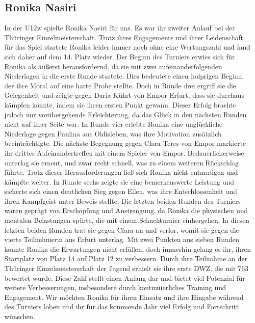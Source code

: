 \documentclass[a4paper,ngerman]{tui-algo-seminar}
\begin{document}
\subsection{Ronika Nasiri}
In der U12w spielte Ronika Nasiri für uns. Es war ihr zweiter Anlauf bei der Thüringer Einzelmeisterschaft. Trotz ihres Engagements und ihrer Leidenschaft für das Spiel startete Ronika leider immer noch ohne eine Wertungszahl und fand sich daher auf dem 14. Platz wieder. Der Beginn des Turniers erwies sich für Ronika als äußerst herausfordernd, da sie mit zwei aufeinanderfolgenden Niederlagen in die erste Runde startete. Dies bedeutete einen holprigen Beginn, der ihre Moral auf eine harte Probe stellte. Doch in Runde drei ergriff sie die Gelegenheit und zeigte gegen Daria Kührt von Empor Erfurt, dass sie durchaus kämpfen konnte, indem sie ihren ersten Punkt gewann. Dieser Erfolg brachte jedoch nur vorübergehende Erleichterung, da das Glück in den nächsten Runden nicht auf ihrer Seite war.
In Runde vier erlebte Ronika eine unglückliche Niederlage gegen Paulina aus Oldisleben, was ihre Motivation zusätzlich beeinträchtigte. Die nächste Begegnung gegen Clara Teres von Empor markierte ihr drittes Aufeinandertreffen mit einem Spieler von Empor. Bedauerlicherweise unterlag sie erneut, und zwar recht schnell, was zu einem weiteren Rückschlag führte. Trotz dieser Herausforderungen ließ sich Ronika nicht entmutigen und kämpfte weiter.
In Runde sechs zeigte sie eine bemerkenswerte Leistung und sicherte sich einen deutlichen Sieg gegen Ellen, was ihre Entschlossenheit und ihren Kampfgeist unter Beweis stellte. Die letzten beiden Runden des Turniers waren geprägt von Erschöpfung und Anstrengung, da Ronika die physischen und mentalen Belastungen spürte, die mit einem Schachturnier einhergehen. In diesen letzten beiden Runden trat sie gegen Clara an und verlor, womit sie gegen die vierte Teilnehmerin aus Erfurt unterlag.
Mit zwei Punkten aus sieben Runden konnte Ronika die Erwartungen nicht erfüllen, doch immerhin gelang es ihr, ihren Startplatz von Platz 14 auf Platz 12 zu verbessern. Durch ihre Teilnahme an der Thüringer Einzelmeisterschaft der Jugend erhielt sie ihre erste DWZ, die mit 763 bewertet wurde. Diese Zahl stellt einen Anfang dar und bietet viel Potenzial für weitere Verbesserungen, insbesondere durch kontinuierliches Training und Engagement. Wir möchten Ronika für ihren Einsatz und ihre Hingabe während des Turniers loben und ihr für das kommende Jahr viel Erfolg und Fortschritt wünschen.
\end{document}
